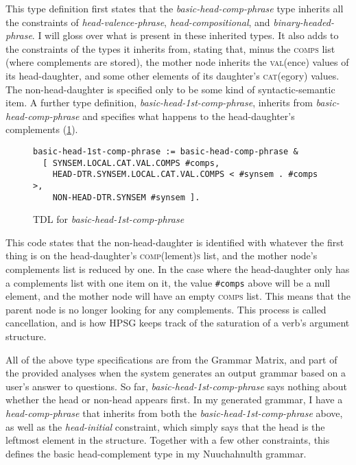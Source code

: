 This type definition first states that the \textit{basic-head-comp-phrase} type inherits all the constraints of \textit{head-valence-phrase}, \textit{head-compositional}, and \textit{binary-headed-phrase}. I will gloss over what is present in these inherited types. It also adds to the constraints of the types it inherits from, stating that, minus the \textsc{comps} list (where complements are stored), the mother node inherits the \textsc{val}(ence) values of its head-daughter, and some other elements of its daughter's \textsc{cat}(egory) values. The non-head-daughter is specified only to be some kind of syntactic-semantic item. A further type definition, \textit{basic-head-1st-comp-phrase}, inherits from \textit{basic-head-comp-phrase} and specifies what happens to the head-daughter's complements (\cref{figure:basic-head-1st-comp-phrase}).

\begin{figure}[H]
\caption{TDL for \textit{basic-head-1st-comp-phrase}}
\label{figure:basic-head-1st-comp-phrase}
\begin{verbatim}
basic-head-1st-comp-phrase := basic-head-comp-phrase &
  [ SYNSEM.LOCAL.CAT.VAL.COMPS #comps,
    HEAD-DTR.SYNSEM.LOCAL.CAT.VAL.COMPS < #synsem . #comps >,
    NON-HEAD-DTR.SYNSEM #synsem ].
\end{verbatim}
\end{figure}

\vspace{-5pt}

This code states that the non-head-daughter is identified with whatever the first thing is on the head-daughter's \textsc{comp}(lement)\textsc{s} list, and the mother node's complements list is reduced by one. In the case where the head-daughter only has a complements list with one item on it, the value \texttt{\#comps} above will be a null element, and the mother node will have an empty \textsc{comps} list. This means that the parent node is no longer looking for any complements. This process is called cancellation, and is how HPSG keeps track of the saturation of a verb's argument structure.

All of the above type specifications are from the Grammar Matrix, and part of the provided analyses when the system generates an output grammar based on a user's answer to questions. So far, \textit{\justify basic-head-1st-comp-phrase} says nothing about whether the head or non-head appears first. In my generated grammar, I have a \textit{head-comp-phrase} that inherits from both the \textit{\justify basic-head-1st-comp-phrase} above, as well as the \textit{head-initial} constraint, which simply says that the head is the leftmost element in the structure. Together with a few other constraints, this defines the basic head-complement type in my Nuuchahnulth grammar.

